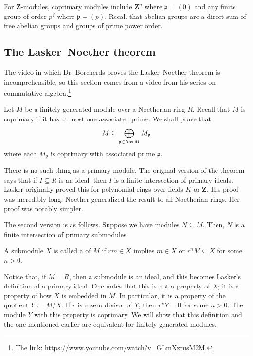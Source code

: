 \documentclass [11 pt, oneside] {article}
\begin{document}
For $\mathbf{Z}$-modules, coprimary modules include $\mathbf{Z}^n$ where $\mathfrak{p}=(0)$ and any finite group of order $p^f$ where $\mathfrak{p} = (p)$. Recall that abelian groups are a direct sum of free abelian groups and groups of prime power order.

\subsection{The Lasker--Noether theorem}
The video in which Dr. Borcherds proves the Lasker--Noether theorem is incomprehensible, so this section comes from a video from his series on commutative algebra.\footnote{The link: \url{https://www.youtube.com/watch?v=GLmXzrusM2M}.}

Let $M$ be a finitely generated module over a Noetherian ring $R$. Recall that $M$ is coprimary if it has at most one associated prime. We shall prove that
\begin{align*}
	M \subseteq \bigoplus_{\mathfrak{p}\in \operatorname{Ass} M} M_{\mathfrak{p}}
\end{align*}
where each $M_{\mathfrak{p}}$ is coprimary with associated prime $ \mathfrak{p}$. 

There is no such thing as a primary module. The original version of the theorem says that if $I\subseteq R$ is an ideal, then $I$ is a finite intersection of primary ideals. Lasker originally proved this for polynomial rings over fields $K$ or $\mathbf{Z}$. His proof was incredibly long. Noether generalized the result to all Noetherian rings. Her proof was notably simpler.

The second version is as follows. Suppose we have modules $N\subseteq M$. Then, $N$ is a finite intersection of primary submodules.

\begin{definition}[ ]\label{}
A submodule $X$ is called a  of $M$ if $rm\in X$ implies $m\in X$ or $r^nM\subseteq X$ for some $n>0$.
\end{definition}

Notice that, if $M=R$, then a submodule is an ideal, and this becomes Lasker's definition of a primary ideal. One notes that this is not a property of $X$; it is a property of how $X$ is embedded in $M$. In particular, it is a property of the quotient $Y:= M/X$. If $r$ is a zero divisor of $Y$, then $r^nY=0$ for some $n>0$. The module $Y$ with this property is coprimary. We will show that this definition and the one mentioned earlier are equivalent for finitely generated modules.
\end{document}
